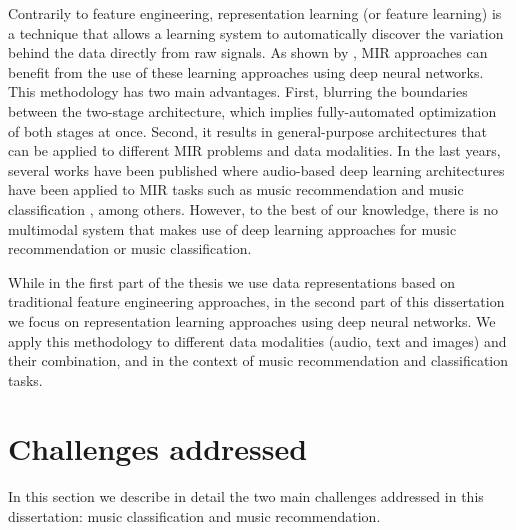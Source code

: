 Contrarily to feature engineering, representation learning (or feature learning) is a technique that allows a learning system to automatically discover the variation behind the data directly from raw signals. As shown by \cite{humphrey2012}, MIR approaches can benefit from the use of these learning approaches using deep neural networks. This methodology has two main advantages. First, blurring the boundaries between the two-stage architecture, which implies fully-automated optimization of both stages at once. Second, it results in general-purpose architectures that can be applied to different MIR problems and data modalities. In the last years, several works have been published where audio-based deep learning architectures have been applied to MIR tasks such as music recommendation \citep{Oord2013} and music classification \citep{Choi2016}, among others. However, to the best of our knowledge, there is no multimodal system that makes use of deep learning approaches for music recommendation or music classification.

While in the first part of the thesis we use data representations based on traditional feature engineering approaches, in the second part of this dissertation we focus on representation learning approaches using deep neural networks. We apply this methodology to different data modalities (audio, text and images) and their combination, and in the context of music recommendation and classification tasks.

\section{Challenges addressed}

In this section we describe in detail the two main challenges addressed in this dissertation: music classification and music recommendation.

